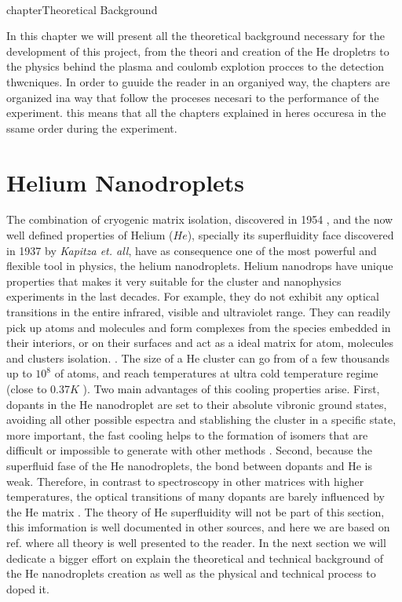 
\\chapter{Theoretical Background}

In this chapter we will present all the theoretical background necessary for the development of this project, from the theori and creation of the He dropletrs to the physics behind the plasma and coulomb explotion procces to the detection thwcniques. In order to guuide the reader in an organiyed way, the chapters are organized ina way that follow the proceses necesari to the performance of the experiment. this means that all the chapters explained in heres occuresa in the ssame order during the experiment.


\section{Helium Nanodroplets}

The combination of cryogenic matrix isolation, discovered in 1954 \cite{whittle_matrix_1954}, and the now well defined properties of Helium ($He$), specially its superfluidity face discovered in 1937 by \textit{Kapitza et. all}\citep{kapitza_viscosity_1938}, have as consequence one of the most powerful and flexible tool in physics, the helium nanodroplets.
Helium nanodrops  have unique properties that makes it  very suitable for the cluster and nanophysics experiments in the last decades. For example, they do not exhibit any optical transitions in the entire infrared, visible and ultraviolet range. They can readily pick up atoms and molecules and  form complexes from the species embedded in their interiors, or on their surfaces and act as a ideal matrix for atom, molecules and clusters isolation. \citep{stienkemeier_spectroscopy_2006}\cite{toennies_superfluid_2004}.
The size of a He cluster can go from of a few thousands up to $10^{8}$ of atoms, and reach temperatures at   ultra cold temperature regime (close to 0.37$K$ \cite{toennies_spectroscopy_1998})\cite{enss_low-temperature_2005}.
Two main advantages of this  cooling properties arise. First,  dopants in the He nanodroplet are set to their absolute vibronic ground states, avoiding all other possible espectra and stablishing the cluster in a specific state, more important, the fast cooling helps to the formation of isomers that are difficult or impossible to generate with other methods \cite{nauta_nonequilibrium_1999}. Second, because the superfluid fase of the He nanodroplets\cite{grebenev_superfluidity_1998}, the bond between dopants and He is weak. Therefore, in contrast to spectroscopy in other matrices with higher temperatures, the optical transitions of many dopants are barely influenced by the He matrix \citep{toennies_superfluid_2004}. 
The theory of  He superfluidity will not be part of this section, this imformation is well documented in other sources, and here we are based on ref.\cite{enss_low-temperature_2005} where all theory is well presented to the reader. In the next section we will dedicate a bigger effort on explain the theoretical and technical background of the He nanodroplets creation as well as the physical and technical process to doped it. 

